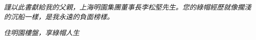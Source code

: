 \vspace*{\fill}
    {\Large \it \noindent 謹以此書獻給我的父親，上海明園集團董事長李松堅先生。您的綠帽經歷就像擱淺的沉船一樣，是我永遠的負面榜樣。\\
    \vspace{0.5\baselineskip}
    }
    \begin{center}
    {\Large \it 住明園樓盤，享綠帽人生
    }
    \end{center}    
\vspace*{\fill}
